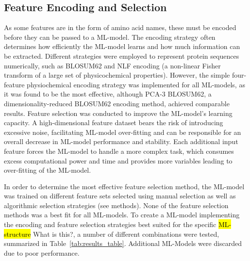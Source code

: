 \documentclass[12pt]{article}
\newcommand{\lilian}[1]{ {\color{red}{\bfseries Lilian:} #1}}
\newcommand{\highlight}[1]{\hl{#1}}
\begin{document}
\subsection{Feature Encoding and Selection}

As some features are in the form of amino acid names, these must be
encoded before they can be passed to a ML-model. The
encoding strategy often determines how efficiently the ML-model learns
and how much information can be extracted. Different strategies were
employed to represent protein sequences numerically, such as BLOSUM62\cite{Henikoff1992} and NLF\cite{Nanni2011} encoding (a non-linear Fisher transform of a large set of physicochemical properties). However, the simple four-feature physiochemical encoding strategy\cite{Abhinandan2010} was implemented for all ML-models, as it was found to be
the most effective, although PCA-3 BLOSUM62, a dimensionality-reduced
BLOSUM62 encoding method, achieved comparable results.
Feature selection was conducted to improve the ML-model's learning
capacity. A high-dimensional feature dataset bears the risk of
introducing excessive noise, facilitating ML-model over-fitting and can be
responsible for an overall decrease in ML-model performance and
stability. Each additional input feature forces the ML-model to
handle a more complex task, which consumes excess computational power
and time and provides more variables leading to over-fitting of the ML-model.

In order to
determine the most effective feature selection method, the
ML-model was trained on different feature sets selected using manual
selection as well as algorithmic selection strategies (see methods).
None of the
feature selection methods was a best fit for all ML-models. To create a ML-model implementing the encoding and feature selection strategies best suited for the specific \highlight{ML-structure} \lilian{What is this?}, a number of different combinations were tested, summarized in Table~\ref{tab:results_table}. Additional ML-Models were discarded due to poor performance. 
\end{document}
